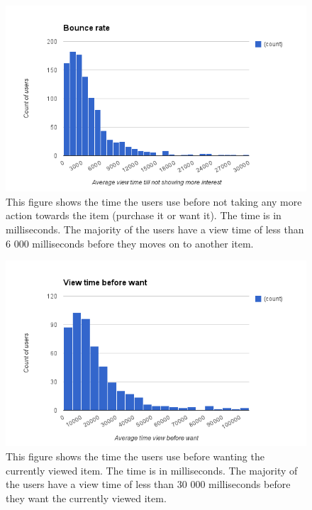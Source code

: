     \begin{figure}[H]
        \includegraphics[width=5in]{image/bounceRate.png}
        \centering
        \caption[View time before leaving an item (Bounce Rate)]{This figure shows the time the users use before not taking any more action towards the item (purchase it or want it).
        The time is in milliseconds.
        The majority of the users have a view time of less than 6 000 milliseconds before they moves on to another item.}
        \label{figure:bounceRate}
    \end{figure}

    \begin{figure}[H]
        \includegraphics[width=5in]{image/viewBeforeWant.png}
        \centering
        \caption[View time before wanting an item]{This figure shows the time the users use before wanting the currently viewed item.
        The time is in milliseconds.
        The majority of the users have a view time of less than 30 000 milliseconds before they want the currently viewed item.}
        \label{figure:viewWant}
    \end{figure}


